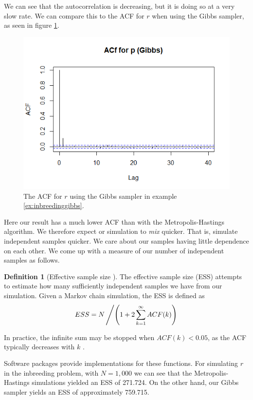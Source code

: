\documentclass[11pt]{amsart}
\theoremstyle{theorem} %
\theoremstyle{definition}                  %
\newtheorem{defn}[thm]{Definition}
\theoremstyle{example}                       %
\theoremstyle{remark}                       %
\numberwithin{equation}{section}
\begin{document}
We can see that the autocorrelation is decreasing, but it is doing so at a very slow rate. We can compare this to the ACF for $r$ when using the Gibbs sampler, as seen in figure \ref{fig:ACFpGibbs}.


\begin{figure}[h]
    \centering
    \includegraphics[width= .65\textwidth]{ACFpGibbs.png}
    \caption{The ACF for $r$ using the Gibbs sampler in example \ref{ex:inbreedinggibbs}.}
    \label{fig:ACFpGibbs}
\end{figure}
    
Here our result has a much lower ACF than with the Metropolis-Hastings algorithm. We therefore expect or simulation to \emph{mix} quicker. That is, simulate independent samples quicker. We care about our samples having little dependence on each other. We come up with a measure of our number of independent samples as follows.

    \begin{defn}[{Effective sample size \cite[p.~184]{dogs}}]
    
    The effective sample size (ESS) attempts to estimate how many sufficiently independent samples we have from our simulation. Given a Markov chain simulation, the ESS is defined as
    \[ESS = N \left / \left(1+2\sum_{k=1}^{\infty}ACF(k)\right) \right.\]
    
    In practice, the infinite sum may be stopped when $ACF(k) < 0.05$, as the ACF typically decreases with $k$ \cite[p.~184]{dogs}.
    
    \end{defn}
    
    Software packages provide implementations for these functions. For simulating $r$ in the inbreeding problem, with $N=1,000$ we can see that the Metropolis-Hastings simulations yielded an ESS of 271.724. On the other hand, our Gibbs sampler yields an ESS of approximately 759.715.
    
\end{document}

